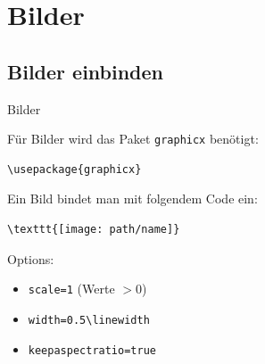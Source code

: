 \section{Bilder}
\subsection{Bilder einbinden}
\begin{frame}[fragile]{Bilder}
\begin{minipage}{0.6\linewidth}
Für Bilder wird das Paket \texttt{graphicx} benötigt:
\begin{lstlisting}[style=tex]
\usepackage{graphicx}
\end{lstlisting}

Ein Bild bindet man mit folgendem Code ein:

\begin{lstlisting}[style=tex]
\texttt{[image: path/name]}
\end{lstlisting}

Options:
\begin{itemize}
\item \verb|scale=1| (Werte $>0$)
\item \verb|width=0.5\linewidth|
\item \verb|keepaspectratio=true|
\end{itemize}


\end{minipage}
\end{frame}
